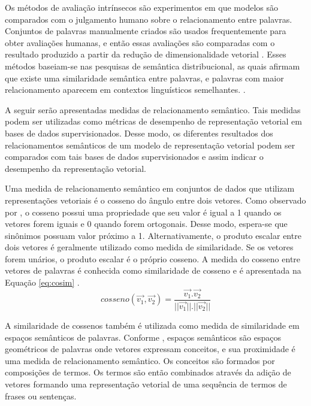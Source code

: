 Os métodos de avaliação intrínsecos são experimentos em que modelos são comparados com o julgamento humano sobre o relacionamento entre palavras. Conjuntos de palavras manualmente criados são usados frequentemente para obter avaliações humanas, e então essas avaliações são comparadas com o resultado produzido a partir da redução de dimensionalidade vetorial \cite{Bakarov2018SurveyWordEmbeddings}. Esses métodos baseiam-se nas pesquisas de semântica distribucional, as quais afirmam que existe uma similaridade semântica entre palavras, e palavras com maior relacionamento aparecem em contextos linguísticos semelhantes. \cite{Lenci2008Distributional}.

A seguir serão apresentadas medidas de relacionamento semântico. Tais medidas podem ser utilizadas como métricas de desempenho de representação vetorial em bases de dados supervisionados. Desse modo, os diferentes resultados dos relacionamentos semânticos de um modelo de representação vetorial podem ser comparados com tais bases de dados supervisionados e assim indicar o desempenho da representação vetorial.

Uma medida de relacionamento semântico em conjuntos de dados que utilizam representações vetoriais é o cosseno do ângulo entre dois vetores. Como observado por \textcite{Singhal2001Modern}, o cosseno possui uma propriedade que seu valor é igual a 1 quando os vetores forem iguais e 0 quando forem ortogonais. Desse modo, espera-se que sinônimos possuam valor próximo a 1. Alternativamente, o produto escalar entre dois vetores é geralmente utilizado como medida de similaridade. Se os vetores forem unários, o produto escalar é o próprio cosseno. A medida do cosseno entre vetores de palavras é conhecida como similaridade de cosseno e é apresentada na Equação \ref{eq:cosim} \cite{Orkphol2019WordSD}.
\begin{equation}
    \label{eq:cosim}
    cosseno(\vec{v_1}, \vec{v_2}) = \frac{\vec{v_1}.\vec{v_2}}{||\vec{v_1}||.||\vec{v_2}||}
\end{equation}

A similaridade de cossenos também é utilizada como medida de similaridade em espaços semânticos de palavras. Conforme \textcite{Basile2014Enhanced}, espaços semânticos são espaços geométricos de palavras onde vetores expressam conceitos, e sua proximidade é uma medida de relacionamento semântico. Os conceitos são formados por composições de termos. Os termos são então combinados através da adição de vetores formando uma representação vetorial de uma sequência de termos de frases ou sentenças.

